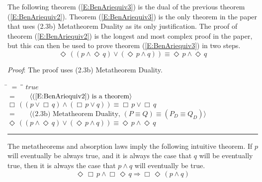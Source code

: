 \documentclass[12pt, fleqn, leqno]{article}
\newcommand{\lgap}{2pt}                             %
\newcommand{\mymathindent}{24pt}                    %
\newcommand{\impl}{\ensuremath{\Rightarrow}}        %
\newcommand{\Event}{\Diamond\,}
\newcommand{\Always}{\Box\,}
\newcommand{\myqed}{\rule[-.23ex]{1.2ex}{2.0ex}}
\newcommand{\myqedtab}{\hspace{384pt}}              %
\newcommand{\Gll} {\langle}                         %
\newcommand{\Ggg} {\rangle}                         %
\newcommand{\Hint}[1]     {\ \ \ $\Gll              \mbox{#1} \Ggg$ }   %
\begin{document}
The following theorem (\ref{E:BenAriequiv3}) is the dual of the previous theorem (\ref{E:BenAriequiv2}).
Theorem (\ref{E:BenAriequiv3}) is the
only theorem in the paper that uses (2.3b) Metatheorem Duality as its only justification. The proof of theorem
(\ref{E:BenAriequiv2}) is the longest and most complex proof in the paper, but this can then be used to prove
theorem (\ref{E:BenAriequiv3}) in two steps.
\begin{equation}\label{E:BenAriequiv3}
\Event ((p \land \Event q) \lor (\Event p \land q)) \equiv \Event p \land \Event q
\end{equation}

\emph{Proof}: The proof uses (2.3b) Metatheorem Duality.
\begin{tabbing}
\hspace{\mymathindent} \= $= \;$ \= \myqedtab \= \kill
  \> \>   $true$\\[\lgap]
  \> $=$  \>  \Hint{(\ref{E:BenAriequiv2}) is a theorem}\\[\lgap]
  \> \>   $\Always ((p \lor \Always q) \land (\Always p \lor q)) \equiv \Always p \lor \Always q$\\[\lgap]
    \> $=$  \>  \Hint{(2.3b) Metatheorem Duality, $(P \equiv Q) \equiv (P_D \equiv Q_D)$}\\[\lgap]
    \> \>   $\Event ((p \land \Event q) \lor (\Event p \land q)) \equiv \Event p \land \Event q$ \quad \myqed
\end{tabbing}


The metatheorems and absorption laws imply the following intuitive theorem.
If $p$ will eventually be always true, and it is always the case that $q$ will be eventually true, then it is always the case that $p\land q$ will eventually be true.
\begin{equation}\label{E:eventAlwaysPAndAlwaysEventQ}
\Event\Always p\land \Always\Event q \impl \Always\Event (p\land q)
\end{equation}
\end{document}
